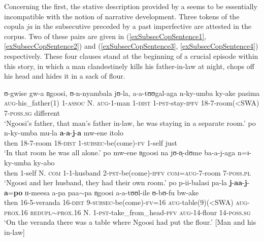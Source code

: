 Concerning the first, the stative description provided by a  seems to be essentially incompatible with the notion of narrative development. Three tokens of the copula \textit{ja} in the subsecutive preceded by a past imperfective are attested in the corpus. Two of these pairs are given in (\ref{exSubsecCopSentence1}, \ref{exSubsecCopSentence2}) and (\ref{exSubsecCopSentence3}, \ref{exSubsecCopSentence4}) respectively. These four clauses stand at the beginning of a crucial episode within this story, in which a man clandestinely kills his father-in-law at night, chops off his head and hides it in a sack of flour.

\begin{exe}
\ex\label{exSubsecCop} \begin{xlist}
\ex\label{exSubsecCopSentence1}\gll ʊ-gwise gw-a n̩goosi, ʊ-n-nyambala jʊ-la, a-a-tʊʊgal-aga n-ky-umba ky-ake pasima\\
\textsc{aug}-his\_father(1) 1-\textsc{assoc} N. \textsc{aug}-1-man 1-\textsc{dist} 1-\textsc{pst}-stay-\textsc{ipfv} 18-7-room(<SWA) 7-\textsc{poss.sg} different\\
\glt `Ngoosi's father, that man's father in-law, he was staying in a separate room.'
\ex\label{exSubsecCopSentence2}\gll po n-ky-umba mu-la \textbf{a}-\textbf{a}-\textbf{j}-\textbf{a} mw-ene itolo\\
then 18-7-room 18-\textsc{dist} 1-\textsc{subsec}-be(come)-\textsc{fv} 1-self just\\
\glt `In that room he was all alone.'
\ex \label{exSubsecCopSentence3}\gll po mw-ene n̩goosi na jʊ-n̩-dʊme ba-a-j-aga n=ɪ-ky-umba ky-abo\\
then 1-self N. \textsc{com} 1-1-husband 2-\textsc{pst}-be(come)-\textsc{ipfv} \textsc{com}=\textsc{aug}-7-room 7-\textsc{poss.pl}\\
\glt `Ngoosi and her husband, they had their own room.'
\ex\label{exSubsecCopSentence4}\gll po p-ii-balasi pa-la \textbf{j}-\textbf{aa}-\textbf{j}-\textbf{a}=\textbf{po} ɪɪ-meesa a-pa paa$\sim$pa n̩goosi a-a-tʊʊl-ile ʊ-bʊ-fu bw-ake\\
then 16-5-veranda 16-\textsc{dist} 9-\textsc{subsec}-be(come)-\textsc{fv}=16 \textsc{aug}-table(9)(<SWA) \textsc{aug}-\textsc{prox.16} \textsc{redupl}$\sim$\textsc{prox.16} N. 1-\textsc{pst}-take\_from\_head-\textsc{pfv} \textsc{aug}-14-flour 14-\textsc{poss.sg}\\
\glt `On the veranda there was a table where Ngoosi had put the flour.' [Man and his in-law]
\end{xlist}
\end{exe}

